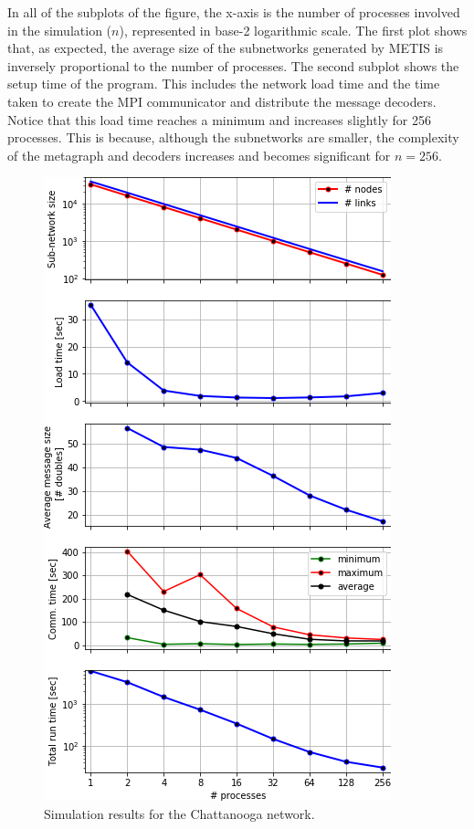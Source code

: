 In all of the subplots of the figure, the x-axis is the number of processes involved in the simulation ($n$), represented in base-2 logarithmic scale. The first plot shows that, as expected, the average size of the subnetworks generated by METIS is inversely proportional to the number of processes. The second subplot shows the setup time of the program. This includes the network load time and the time taken to create the MPI communicator and distribute the message decoders. Notice that this load time reaches a minimum and increases slightly for 256 processes. This is because, although the subnetworks are smaller, the complexity of the metagraph and decoders increases and becomes significant for $n=256$. 
\begin{figure}[!ht]
\centering
\includegraphics[width=\columnwidth]{figs/chattanooga_plots.png}
\caption{Simulation results for the Chattanooga network.}
\label{fig:chattanooga_plots}
\end{figure}

